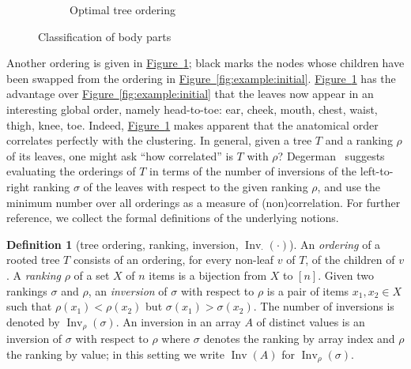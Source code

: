 \documentclass[11pt]{article}
\numberwithin{equation}{section}
\theoremstyle{definition}
\newtheorem{definition}[theorem]{Definition}
\theoremstyle{plain}
\newcommand{\expref}[2]{\hyperref[#2]{#1~\ref{#2}}}
\newcommand{\ranking}{\rho}
\newcommand{\ordering}{\sigma}
\DeclareMathOperator{\Inv}{Inv}
\begin{document}
\begin{figure}[ht]
\begin{subfigure}[b]{0.45\textwidth}
\caption{Optimal tree ordering}\label{fig:example:optimal}
\end{subfigure}
\caption{Classification of body parts}\label{fig:example}
\end{figure}

Another ordering is given in \expref{Figure}{fig:example:optimal}; black marks the nodes whose children have been swapped from the ordering in \expref{Figure}{fig:example:initial}. \expref{Figure}{fig:example:optimal} has the advantage over \expref{Figure}{fig:example:initial} that the leaves now appear in an interesting global order, namely head-to-toe: ear, cheek, mouth, chest, waist, thigh, knee, toe. Indeed, \expref{Figure}{fig:example:optimal} makes apparent that the anatomical order correlates perfectly with the clustering. In general, given a tree $T$ and a ranking $\ranking$ of its leaves, one might ask ``how correlated'' is $T$ with $\ranking$? Degerman~\cite{Degerman1982} suggests evaluating the orderings of $T$ in terms of the number of inversions of the left-to-right ranking $\ordering$ of the leaves with respect to the given ranking $\ranking$, and use the minimum number over all orderings as a measure of (non)correlation. For further reference, we collect the formal definitions of the underlying notions.
\begin{definition}[tree ordering, ranking, inversion, $\Inv_{\cdot}(\cdot)$]
An \emph{ordering} of a rooted tree $T$ consists of an ordering, for every non-leaf $v$ of $T$, of the children of $v$. 
A \emph{ranking} $\ranking$ of a set $X$ of $n$ items is a bijection from $X$ to $[n]$. 
Given two rankings $\ordering$ and $\ranking$, an \emph{inversion} of $\ordering$ with respect to $\ranking$ is a pair of items $x_1,x_2\in X$ such that $\ranking(x_1) < \ranking(x_2)$ but $\ordering(x_1) > \ordering(x_2)$. The number of inversions is denoted by $\Inv_\ranking(\ordering)$.
An inversion in an array $A$ of
%
%
%
distinct values is an inversion of $\ordering$ with respect to $\ranking$ where $\ordering$ denotes the ranking by array index and $\ranking$ the ranking by value; in this setting we write $\Inv(A)$ for $\Inv_\ranking(\sigma)$.
\end{definition}
\end{document}
